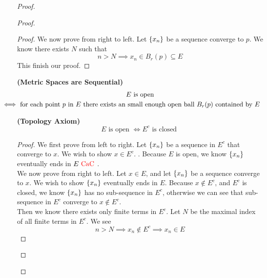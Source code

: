 \documentclass{report}
\begin{document}
\begin{proof}
\begin{proof}
\begin{proof}
We now prove from right to left. Let $\{ x_n \}$ be a sequence converge to $p$. We know there exists $N$ such that
\begin{equation}
n>N\implies x_n\in B_r(p)\subseteq E
\end{equation}
This finish our proof.
\end{proof}
\begin{corollary}
\label{3.3.11}
\textbf{(Metric Spaces are Sequential)} 
\begin{gather}
\text{ $E$ is open  }\\
\liff \text{ for each point  $p$ in  $E$ there exists an small enough open ball $B_r(p)$ contained by $E$ }
\end{gather}
\end{corollary}
\begin{theorem}
\label{3.3.12}
\textbf{(Topology Axiom)}
\begin{equation}
E\text{ is open  }\iff E^c\text{ is closed }
\end{equation}
\end{theorem}
\begin{proof}
We first prove from left to right. Let $\{ x_n \}$ be a sequence in $E^c$ that converge to $x$. We wish to show  $x\in E^c$. . Because $E$ is open, we know $\{ x_n \}$ eventually ends in $E\text{ \textcolor{red}{CaC} }$.\\

We now prove from right to left. Let $x\in E$, and let $\{ x_n \}$ be a sequence converge to $x$. We wish to show  $\{ x_n \}$ eventually ends in $E$. Because  $x\not \in E^c$, and $E^c$ is closed, we know  $\{ x_n \}$ has no sub-sequence in  $E^c$, otherwise we can see that sub-sequence in $E^c$ converge to  $x\not\in E^c$.\\

Then we know there exists only finite terms in $E^c$. Let $N$ be the maximal index of all finite terms in  $E^c$. We see
 \begin{equation}
n>N\implies x_n\not\in E^c\implies x_n\in E
\end{equation}
\end{proof}

\end{proof}
\end{proof}
\end{document}
